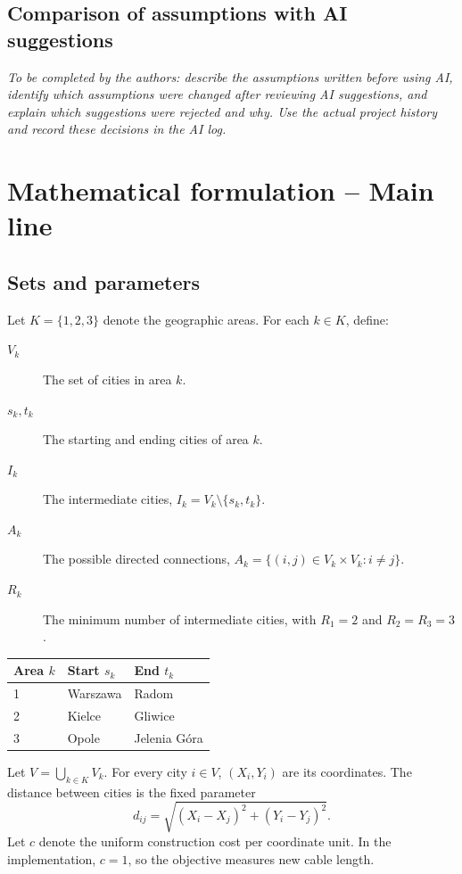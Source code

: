 \documentclass[11pt,a4paper]{article}
\begin{document}
\subsection{Comparison of assumptions with AI suggestions}
\textit{To be completed by the authors: describe the assumptions written before using AI, identify which assumptions were changed after reviewing AI suggestions, and explain which suggestions were rejected and why. Use the actual project history and record these decisions in the AI log.}

\section{Mathematical formulation -- Main line}
\subsection{Sets and parameters}

Let $K=\{1,2,3\}$ denote the geographic areas. For each $k\in K$, define:
\begin{description}
  \item[$V_k$] The set of cities in area $k$.
  \item[$s_k,t_k$] The starting and ending cities of area $k$.
  \item[$I_k$] The intermediate cities, $I_k=V_k\setminus\{s_k,t_k\}$.
  \item[$A_k$] The possible directed connections, $A_k=\{(i,j)\in V_k\times V_k:i\ne j\}$.
  \item[$R_k$] The minimum number of intermediate cities, with $R_1=2$ and $R_2=R_3=3$.
\end{description}

\begin{center}
\begin{tabular}{lll}
\toprule
Area $k$ & Start $s_k$ & End $t_k$\\
\midrule
1 & Warszawa & Radom\\
2 & Kielce & Gliwice\\
3 & Opole & Jelenia Góra\\
\bottomrule
\end{tabular}
\end{center}

Let $V=\bigcup_{k\in K}V_k$. For every city $i\in V$, $(X_i,Y_i)$ are its coordinates. The distance between cities is the fixed parameter
\begin{equation}
d_{ij}=\sqrt{(X_i-X_j)^2+(Y_i-Y_j)^2}.
\end{equation}
Let $c$ denote the uniform construction cost per coordinate unit. In the implementation, $c=1$, so the objective measures new cable length.
\end{document}
